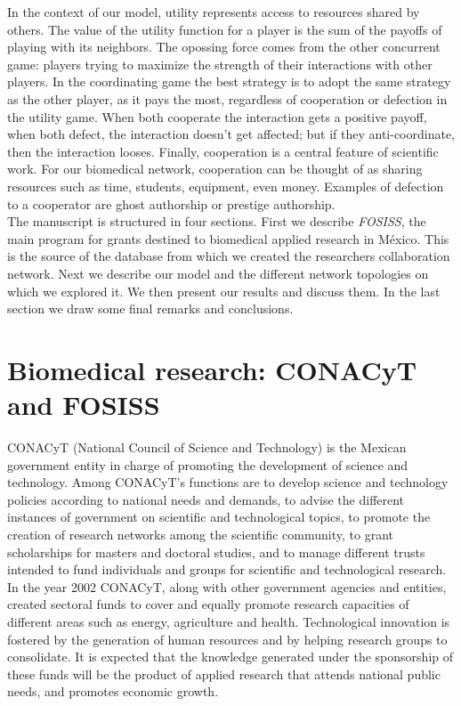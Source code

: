 \documentclass{bmcart}
\begin{document}
In the context of our model, utility represents
  access to resources shared by others.
  The value of the utility function for a player is the sum of the payoffs of playing
  with its neighbors. The opossing force comes from the other concurrent game: players
  trying to maximize the strength of their interactions with other players. In the coordinating game
  the best strategy is to adopt the same strategy as the other player, as it pays the most,
  regardless of cooperation or defection in the utility game. When
  both cooperate the interaction gets a positive payoff, when both defect, the
  interaction doesn't get affected; but if they anti-coordinate, then the
  interaction looses. Finally, cooperation is a central feature of scientific work.
  For our biomedical network, cooperation can be thought of
  as sharing resources such as time, students, equipment, even money. Examples of defection
  to a cooperator are ghost authorship or
  prestige authorship.\\



The manuscript is structured in four sections. First we describe
\textit{FOSISS}, the main program for grants destined to biomedical applied
research in M\'exico. This is the source of the
database from which we created the researchers collaboration network. Next we
describe our model
and the different network topologies on which we explored it.
We then present our results and discuss them. In the last section
we draw some final remarks and conclusions.

\section*{Biomedical research: CONACyT and FOSISS}

CONACyT (National Council of Science and Technology) is the Mexican government
entity in charge of promoting the development of science and 
technology.
Among CONACyT's functions are to develop science and technology
policies according to national needs and demands, to advise the different
instances of government on scientific and technological topics, to promote the
creation of research networks among the scientific community, to grant
scholarships for masters and doctoral studies, and to manage different trusts 
intended to fund individuals and groups for scientific and
technological research.\\

In the year 2002 CONACyT, along with other government agencies and
entities, created sectoral funds
to cover and equally
promote research capacities of different areas such as energy, agriculture
and health. Technological innovation is fostered by the generation of human resources
and by helping research groups to consolidate. It is expected that the
knowledge generated under the sponsorship of these funds
will be the product of applied research that attends national public
needs, and promotes economic growth.\\
\end{document}
